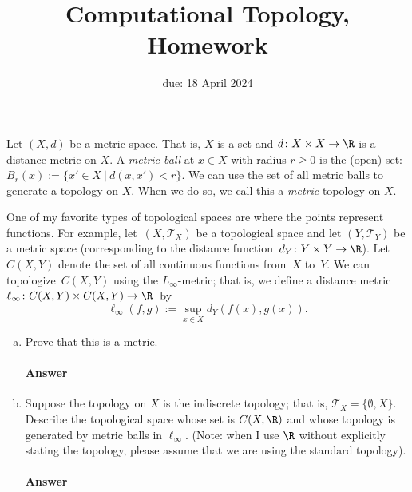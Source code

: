 \documentclass{article}
\title{Computational Topology, Homework \hwnum}
\author{\todo{your name here}}
\date{due: 18 April 2024}
\begin{document}
\maketitle



Let $(X,d)$ be a metric space.  That is, $X$ is a set and $d \colon X \times X
\to \R$ is a distance metric on $X$.  A \emph{metric ball} at $x \in X$ with
radius $r \geq 0$ is the (open) set: $B_r(x) := \{x' \in X ~|~ d(x,x') < r \}$.
We can use the set of all metric balls to generate a
topology on $X$.  When we do so, we call this a \emph{metric} topology on $X$.

One of my favorite types of topological spaces are where the points represent
functions.  For example, let~$(X,\mathcal{T}_X)$ be a topological space
and let $(Y,\mathcal{T}_Y)$ be
a metric space (corresponding to the distance function~$d_Y
\colon Y \times Y \to \R$).  Let $C(X,Y)$ denote the set of all continuous
functions from~$X$ to~$Y$.  We can topologize~$C(X,Y)$ using the $L_{\infty}$-metric; that is,
we define a distance metric $\ell_{\infty} \colon C(X,Y) \times C(X,Y) \to
\R$~by
$$\ell_{\infty}(f,g) := \sup_{x \in X} d_Y(f(x),g(x)).$$

\begin{enumerate}[(a)]

    \item Prove that this is a metric.

        \paragraph{Answer}

    \item Suppose the topology on $X$ is the indiscrete topology; that is,
        $\mathcal{T}_X=\{\emptyset,X\}$.  Describe the topological space whose
        set is $C(X,\R)$ and whose topology is generated by metric balls in
        $\ell_{\infty}$. (Note: when I use $\R$ without explicitly stating the
        topology, please assume that we are using the standard topology).

        \paragraph{Answer}

\end{enumerate}
\end{document}
